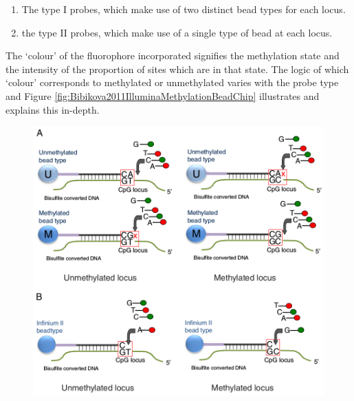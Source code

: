 \documentclass[
]{book}
\providecommand{\tightlist}{%
  \setlength{\itemsep}{0pt}\setlength{\parskip}{0pt}}
\begin{document}
\begin{enumerate}
\def\labelenumi{\arabic{enumi}.}
\tightlist
\item
  The type I probes, which make use of two distinct bead types for each locus.
\item
  the type II probes, which make use of a single type of bead at each locus.
\end{enumerate}

The `colour' of the fluorophore incorporated signifies the methylation state and the intensity of the proportion of sites which are in that state.
The logic of which `colour' corresponds to methylated or unmethylated varies with the probe type and Figure \ref{fig:Bibikova2011IlluminaMethylationBeadChip} illustrates and explains this in-depth.

\begin{figure}

{\centering \includegraphics[width=0.6\linewidth]{figs/Bibikova2011IlluminaMethylationBeadChip} 

}


\end{figure}
\end{document}
